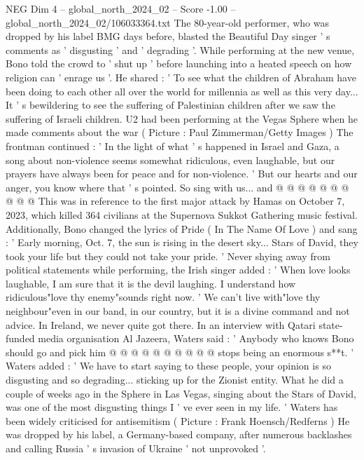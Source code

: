 \begin{textsample}{NEG Dim 4 – global\_north\_2024\_02 – Score -1.00 – global\_north\_2024\_02/106033364.txt}  \label{ex:f4_neg_281}
The 80-year-old performer, who was dropped by his label BMG days before, blasted the Beautiful Day singer ' s comments as ' disgusting ' and ' degrading '.
While performing at the new venue, Bono told the crowd to ' shut up ' before launching into a heated speech on how religion can ' enrage us '.
He shared : ' To see what the children of Abraham have been doing to each other all over the world for millennia as well as this very day...
It ' s bewildering to see the suffering of Palestinian children after we saw the suffering of Israeli children.
U2 had been performing at the Vegas Sphere when he made comments about the war ( Picture : Paul Zimmerman/Getty Images ) The frontman continued : ' In the light of what ' s happened in Israel and Gaza, a song about non-violence seems somewhat ridiculous, even laughable, but our prayers have always been for peace and for non-violence. ' But our hearts and our anger, you know where that ' s pointed.
So sing with us... and @ @ @ @ @ @ @ @ @ @ This was in reference to the first major attack by Hamas on October 7, 2023, which killed 364 civilians at the Supernova Sukkot Gathering music festival.
Additionally, Bono changed the lyrics of Pride ( In The Name Of Love ) and sang : ' Early morning, Oct. 7, the sun is rising in the desert sky...
Stars of David, they took your life but they could not take your pride. ' Never shying away from political statements while performing, the Irish singer added : ' When love looks laughable, I am sure that it is the devil laughing.
I understand how ridiculous"love thy enemy"sounds right now. ' We can't live with"love thy neighbour"even in our band, in our country, but it is a divine command and not advice.
In Ireland, we never quite got there.
In an interview with Qatari state-funded media organisation Al Jazeera, Waters said : ' Anybody who knows Bono should go and pick him @ @ @ @ @ @ @ @ @ @ stops being an enormous s**t. ' Waters added : ' We have to start saying to these people, your opinion is so disgusting and so degrading... sticking up for the Zionist entity.
What he did a couple of weeks ago in the Sphere in Las Vegas, singing about the Stars of David, was one of the most disgusting things I ' ve ever seen in my life. ' Waters has been widely criticised for antisemitism ( Picture : Frank Hoensch/Redferns ) He was dropped by his label, a Germany-based company, after numerous backlashes and calling Russia ' s invasion of Ukraine ' not unprovoked '.

\end{textsample}
